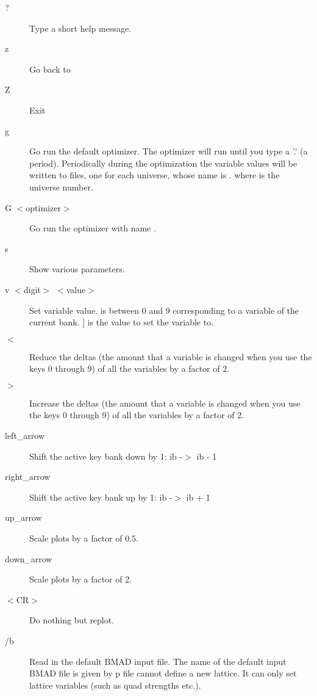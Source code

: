 \begin{description}
\item[?]
Type a short help message.

\item[z] 
Go back to 

\item[Z] 
Exit \tao
                                        
\item[g]
Go run the default optimizer. The optimizer will run until you type a 
'.' (a period).
Periodically during the optimization the variable values
will be written to files, one for each universe, whose name is 
. where \vn{\#} is the universe number.

\item[G $<$optimizer$>$]
Go run the optimizer with name .

\item[s]  
Show various parameters.

\item[v $<$digit$>$ $<$value$>$]
Set variable value.  is between 0 and 9 corresponding
to a variable of the current bank. ] is the value to set the
variable to.

\item[$<$]
Reduce the deltas (the amount that a variable is changed when you use the
keys 0 through 9) of all the variables by a factor of 2.

\item[$>$]
Increase the deltas (the amount that a variable is changed when you use
the keys 0 through 9) of all the variables by a factor of 2.

\item[left\_arrow]
Shift the active key bank down by 1: ib -$>$ ib - 1

\item[right\_arrow]
Shift the active key bank up by 1: ib -$>$ ib + 1

\item[up\_arrow]
Scale plots by a factor of 0.5.

\item[down\_arrow]
Scale plots by a factor of 2.

\item[$<$CR$>$]
Do nothing but replot.

\item[/b] 
Read in the default BMAD input file.
The name of the default input BMAD file is given by p%
file cannot define a new lattice. It can only set lattice variables (such as
quad strengths etc.).


\end{description}
